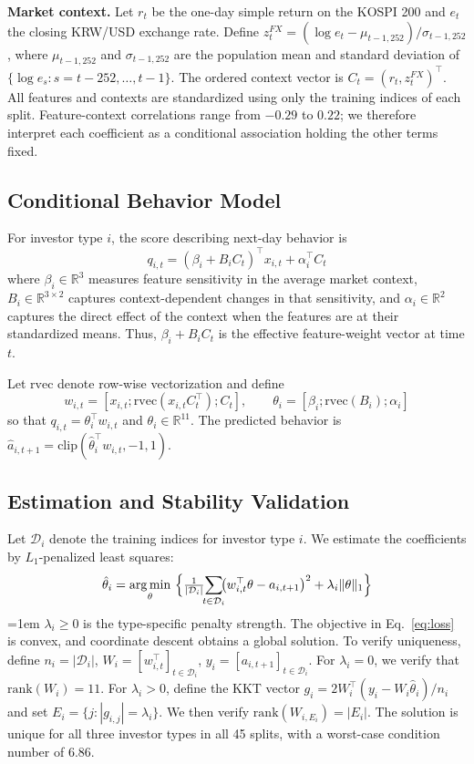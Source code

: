 \textbf{Market context.}
Let $r_t$ be the one-day simple return on the KOSPI 200 and $e_t$ the closing KRW/USD
exchange rate. Define
$z^{FX}_t=(\log e_t-\mu_{t-1,252})/\sigma_{t-1,252}$, where
$\mu_{t-1,252}$ and $\sigma_{t-1,252}$ are the population mean and standard deviation of
$\{\log e_s:s=t-252,\ldots,t-1\}$. The ordered context vector is
$C_t=(r_t,z^{FX}_t)^\top$. All features and contexts are standardized using only the
training indices of each split. Feature-context correlations range from $-0.29$ to $0.22$;
we therefore interpret each coefficient as a conditional association holding the other
terms fixed.

\subsection{Conditional Behavior Model}
\label{sec:model}

For investor type $i$, the score describing next-day behavior is
\begin{equation}
q_{i,t}=(\beta_i+B_iC_t)^\top x_{i,t}+\alpha_i^\top C_t
\label{eq:model}
\end{equation}
where $\beta_i\in\mathbb R^3$ measures feature sensitivity in the average market context,
$B_i\in\mathbb R^{3\times2}$ captures context-dependent changes in that sensitivity, and
$\alpha_i\in\mathbb R^2$ captures the direct effect of the context when the features are
at their standardized means. Thus, $\beta_i+B_iC_t$ is the effective feature-weight vector
at time $t$.

Let $\mathrm{rvec}$ denote row-wise vectorization and define
\[
w_{i,t}=[x_{i,t};\mathrm{rvec}(x_{i,t}C_t^\top);C_t],\qquad
\theta_i=[\beta_i;\mathrm{rvec}(B_i);\alpha_i]
\]
so that $q_{i,t}=\theta_i^\top w_{i,t}$ and $\theta_i\in\mathbb R^{11}$. The predicted
behavior is $\hat a_{i,t+1}=\mathrm{clip}(\hat\theta_i^\top w_{i,t},-1,1)$.

\subsection{Estimation and Stability Validation}
\label{sec:protocol}

Let $\mathcal D_i$ denote the training indices for investor type $i$. We estimate the
coefficients by $L_1$-penalized least squares:
\begin{equation}
\hat\theta_i=\operatorname*{arg\,min}_{\theta}\ \Bigl\{\tfrac{1}{|\mathcal{D}_i|}
\!\!\sum_{t\in\mathcal{D}_i}\!\!\bigl(w_{i,t}^{\top}\theta-a_{i,t+1}\bigr)^{2}
+\lambda_i\lVert\theta\rVert_1\Bigr\}
\label{eq:loss}
\end{equation}
{\emergencystretch=1em
$\lambda_i\ge0$ is the type-specific penalty strength. The objective in
Eq.~\eqref{eq:loss} is convex, and coordinate descent obtains a global solution. To verify
uniqueness, define $n_i=|\mathcal D_i|$,
$W_i=[w_{i,t}^{\top}]_{t\in\mathcal D_i}$,
$y_i=[a_{i,t+1}]_{t\in\mathcal D_i}$. For $\lambda_i=0$, we verify that
$\mathrm{rank}(W_i)=11$. For $\lambda_i>0$, define the KKT vector
$g_i=2W_i^\top(y_i-W_i\hat\theta_i)/n_i$ and set
$E_i=\{j:|g_{i,j}|=\lambda_i\}$. We then verify
$\mathrm{rank}(W_{i,E_i})=|E_i|$. The solution is unique for all three investor types
in all 45 splits, with a worst-case condition number of 6.86.
}

